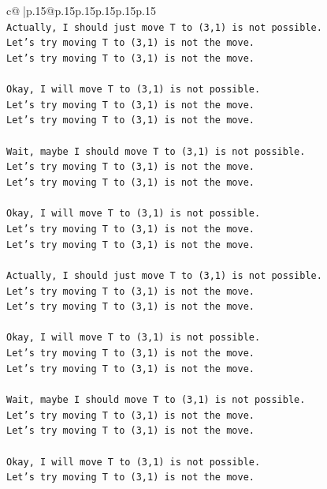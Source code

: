 \documentclass{article}
\begin{document}
{\begin{supertabular}{c@{$\;$}|p{.15\linewidth}@{}p{.15\linewidth}p{.15\linewidth}p{.15\linewidth}p{.15\linewidth}p{.15\linewidth}}
{{{\\ 
\texttt{Actually, I should just move T to (3,1) is not possible.} \\
\texttt{Let's try moving T to (3,1) is not the move.} \\
\texttt{Let's try moving T to (3,1) is not the move.} \\
\\ 
\texttt{Okay, I will move T to (3,1) is not possible.} \\
\texttt{Let's try moving T to (3,1) is not the move.} \\
\texttt{Let's try moving T to (3,1) is not the move.} \\
\\ 
\texttt{Wait, maybe I should move T to (3,1) is not possible.} \\
\texttt{Let's try moving T to (3,1) is not the move.} \\
\texttt{Let's try moving T to (3,1) is not the move.} \\
\\ 
\texttt{Okay, I will move T to (3,1) is not possible.} \\
\texttt{Let's try moving T to (3,1) is not the move.} \\
\texttt{Let's try moving T to (3,1) is not the move.} \\
\\ 
\texttt{Actually, I should just move T to (3,1) is not possible.} \\
\texttt{Let's try moving T to (3,1) is not the move.} \\
\texttt{Let's try moving T to (3,1) is not the move.} \\
\\ 
\texttt{Okay, I will move T to (3,1) is not possible.} \\
\texttt{Let's try moving T to (3,1) is not the move.} \\
\texttt{Let's try moving T to (3,1) is not the move.} \\
\\ 
\texttt{Wait, maybe I should move T to (3,1) is not possible.} \\
\texttt{Let's try moving T to (3,1) is not the move.} \\
\texttt{Let's try moving T to (3,1) is not the move.} \\
\\ 
\texttt{Okay, I will move T to (3,1) is not possible.} \\
\texttt{Let's try moving T to (3,1) is not the move.} \\
}}}
\end{supertabular}}
\end{document}
